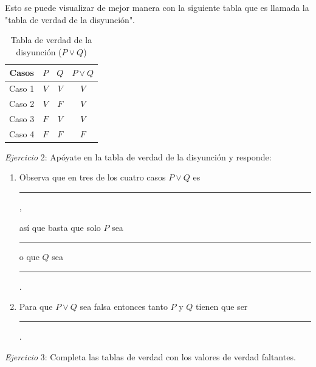 \documentclass[letterpaper, twoside]{article}
\begin{document}
\vspace{.5cm}

Esto se puede visualizar de mejor manera con la siguiente tabla que es llamada la "tabla de verdad de la disyunción".

\begin{table}[h]
  \centering
  \begin{tabular}{|c|c|c|c|}
    \hline
    Casos  & $P$ & $Q$ & $P\lor Q$ \\ \hline
    Caso 1 & $V$ & $V$ & $V$ \\ \hline
    Caso 2 & $V$ & $F$ & $V$ \\ \hline
    Caso 3 & $F$ & $V$ & $V$ \\ \hline
    Caso 4 & $F$ & $F$ & $F$ \\ \hline 
  \end{tabular}
  \caption*{Tabla de verdad de la disyunción ($P\lor Q$)}
\end{table}

\newpage

\textit{Ejercicio} 2: Apóyate en la tabla de verdad de la disyunción y responde:

\begin{enumerate}
  \item Observa que en tres de los cuatro casos $P\lor Q$ es \rule{5cm}{.02cm},\par así que basta que solo $P$ sea \rule{4cm}{.02cm} o que $Q$ sea \rule{4cm}{.02cm}.

  \item Para que $P\lor Q$ sea falsa entonces tanto $P$ y $Q$ tienen que ser \rule{5cm}{.02cm}.
\end{enumerate}

\vspace{1cm}

\textit{Ejercicio} 3: Completa las tablas de verdad con los valores de verdad faltantes.

\vspace{.5cm}
\end{document}
